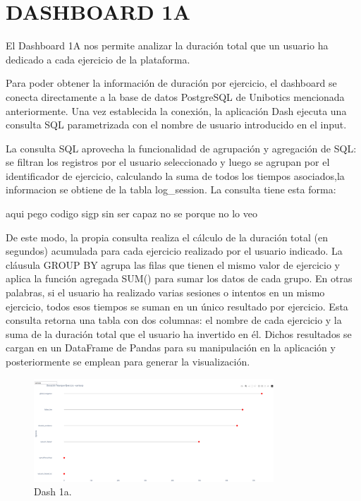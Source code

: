 \documentclass[a4paper, 12pt]{book}
\begin{document}
\section{DASHBOARD 1A}

El Dashboard 1A nos permite analizar la duración total que un usuario ha dedicado a cada ejercicio de la plataforma.

Para poder obtener la información de duración por ejercicio, el dashboard se conecta directamente a la base de datos PostgreSQL de Unibotics mencionada anteriormente.
Una vez establecida la conexión, la aplicación Dash ejecuta una consulta SQL parametrizada con el nombre de usuario introducido en el input.

La consulta SQL aprovecha la funcionalidad de agrupación y agregación de SQL: se filtran los registros por el usuario seleccionado y luego se agrupan por el identificador de ejercicio, calculando la suma de todos los tiempos asociados,la informacion se obtiene de la tabla log\_session. La consulta tiene esta forma:

aqui pego codigo sigp sin ser capaz no se porque no lo veo

De este modo, la propia consulta realiza el cálculo de la duración total (en segundos) acumulada para cada ejercicio realizado por el usuario indicado. La cláusula GROUP BY agrupa las filas que tienen el mismo valor de ejercicio y aplica la función agregada SUM() para sumar los datos de cada grupo.
En otras palabras, si el usuario ha realizado varias sesiones o intentos en un mismo ejercicio, todos esos tiempos se suman en un único resultado por ejercicio. Esta consulta retorna una tabla con dos columnas: el nombre de cada ejercicio y la suma de la duración total que el usuario ha invertido en él. Dichos resultados se cargan en un DataFrame de Pandas para su manipulación en la aplicación y posteriormente se emplean para generar la visualización.

\begin{figure}
  \centering
  \includegraphics[width=9cm, keepaspectratio]{img/1a.png}
  \caption{Dash 1a.}\label{fig:1a}
\end{figure}
\end{document}
